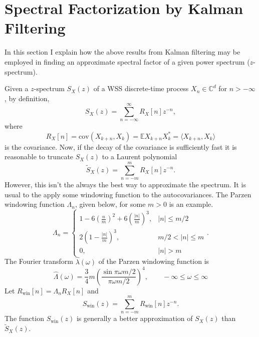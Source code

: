 \documentclass[12pt]{amsart}
\newcommand{\E}{\mathbb{E}}
\newcommand{\C}{\mathbb{C}}
\newcommand{\cov}{\mathrm{cov}}
\begin{document}
 
\section{Spectral Factorization by Kalman Filtering}
\label{sec: Factor}

In this section I explain how the above results from Kalman filtering may be employed in finding an approximate spectral factor of a given power spectrum ($z$-spectrum).

Given a $z$-spectrum $S_X(z)$ of a WSS discrete-time process $X_n\in \C^d$ for $n>-\infty$, by definition, $$S_X(z) = \sum_{n=-\infty}^{\infty} R_X[n]z^{-n},$$
where $$R_X[n] = \cov(X_{k+n},X_{k}) = \E X_{k+n}X_{k}^* = \langle X_{k+n},X_{k}\rangle$$ is the covariance. Now, if the decay of the covariance is sufficiently fast it is reasonable to truncate $S_X(z)$ to a Laurent polynomial
$$\tilde{S}_X(z) = \sum_{n=-m}^{m} R_X[n]z^{-n}.$$
However, this isn't the always the best way to approximate the spectrum. It is usual to the apply some windowing function to the autocovariances. The Parzen windowing function $\Lambda_n$, given below, for some $m>0$ is an example. 
$$\Lambda_n = \begin{cases}
1-6\left(\frac{n}{m}\right)^2+6\left(\frac{|n|}{m}\right)^3, & |n|\le m/2 \\
2\left(1-\frac{|n|}{m}\right)^3, & m/2 < |n| \le m \\
0, & |n| > m
\end{cases}.$$
The Fourier transform $\widehat{\lambda}(\omega)$ of the Parzen windowing function is 
$$\widehat{\Lambda}(\omega) = \frac{3}{4}m\left(\frac{\sin \pi \omega m/2}{\pi \omega m/2}\right)^4,\qquad -\infty \le \omega \le \infty$$
Let $R_\text{win}[n] = \Lambda_nR_X[n]$ and 
$$S_\text{win}(z) = \sum_{n=-m}^{m} R_\text{win}[n]z^{-n}.$$
The function $S_\text{win}(z)$ is generally a better approximation of $S_{X}(z)$ than $\tilde{S}_{X}(z).$ 
\end{document}
